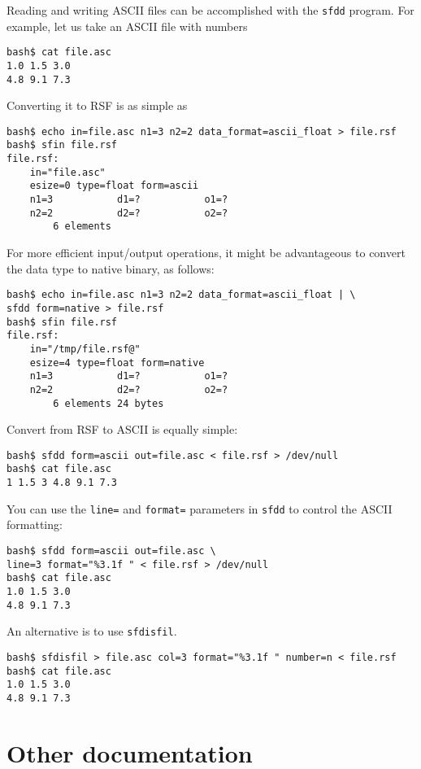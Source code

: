 Reading and writing ASCII files can be accomplished with the \texttt{sfdd}
program. For example, let us take an ASCII file with numbers
\begin{verbatim}
bash$ cat file.asc
1.0 1.5 3.0
4.8 9.1 7.3
\end{verbatim}
Converting it to RSF is as simple as
\begin{verbatim}
bash$ echo in=file.asc n1=3 n2=2 data_format=ascii_float > file.rsf
bash$ sfin file.rsf
file.rsf:
    in="file.asc"
    esize=0 type=float form=ascii
    n1=3           d1=?           o1=?
    n2=2           d2=?           o2=?
        6 elements
\end{verbatim}
For more efficient input/output operations, it might be advantageous to
convert the data type to native binary, as follows:
\begin{verbatim}
bash$ echo in=file.asc n1=3 n2=2 data_format=ascii_float | \
sfdd form=native > file.rsf
bash$ sfin file.rsf
file.rsf:
    in="/tmp/file.rsf@"
    esize=4 type=float form=native
    n1=3           d1=?           o1=?
    n2=2           d2=?           o2=?
        6 elements 24 bytes
\end{verbatim}

Convert from RSF to ASCII is equally simple:
\begin{verbatim}
bash$ sfdd form=ascii out=file.asc < file.rsf > /dev/null
bash$ cat file.asc
1 1.5 3 4.8 9.1 7.3
\end{verbatim}
You can use the \texttt{line=} and \texttt{format=} parameters in
\texttt{sfdd} to control the ASCII formatting:
\begin{verbatim}
bash$ sfdd form=ascii out=file.asc \
line=3 format="%3.1f " < file.rsf > /dev/null
bash$ cat file.asc
1.0 1.5 3.0
4.8 9.1 7.3
\end{verbatim}
An alternative is to use \texttt{sfdisfil}.
\begin{verbatim}
bash$ sfdisfil > file.asc col=3 format="%3.1f " number=n < file.rsf
bash$ cat file.asc
1.0 1.5 3.0
4.8 9.1 7.3
\end{verbatim}

\section{Other documentation}


